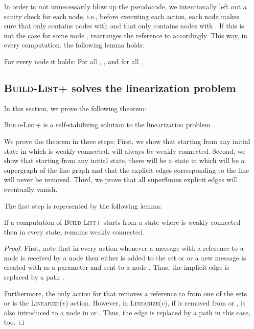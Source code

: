 \documentclass[a4paper,USenglish]{lipics}
\newcommand{\blp}{\textsc{Build-List+}\xspace}
\newcommand{\linearize}[1]{\textsc{Linearize(\ensuremath{#1})}\xspace}
\begin{document}
In order to not unnecessarily blow up the pseudocode, we intentionally left out a sanity check for each node, i.e., before executing each action, each node  makes sure that  only contains nodes  with  and that  only contains nodes  with .
If this is not the case for some node ,  rearranges the reference to  accordingly.
This way, in every computation, the following lemma holds:

\begin{lemma}\label{lem:left_and_right_are_what_they_say}
  For every node  it holds: For all , , and for all , .
\end{lemma}


\subsection{\blp solves the linearization problem}\label{sec:self_stabilization_proof}
In this section, we prove the following theorem:
\begin{theorem}\label{thm:blp_solves_linearization}
 \blp is a self-stabilizing solution to the linearization problem. 
\end{theorem}
We prove the theorem in three steps: 
First, we show that starting from any initial state in which  is weakly connected,  will always be weakly connected.
Second, we show that starting from any initial state, there will be a state in which  will be a supergraph of the line graph and that the explicit edges corresponding to the line will never be removed.
Third, we prove that all superfluous explicit edges will eventually vanish.


The first step is represented by the following lemma:
\begin{lemma}\label{lem:NG_remains_weakly_connected}
 If a computation of \blp starts from a state where  is weakly connected then in every state,  remains weakly connected.
\end{lemma}

\begin{proof}
  First, note that in every action whenever a message with a reference to a node  is received by a node  then either  is added to the set  or  or a new message is created with  as a parameter and sent to a node .
  Thus, the implicit edge  is replaced by a path .
  
  Furthermore, the only action for that removes a reference to  from one of the sets  or  is the \linearize{v} action.
  However, in \linearize{v}, if  is removed from  or ,  is also introduced to a node  in  or .
  Thus, the edge  is replaced by a path  in this case, too.
\end{proof}
\end{document}
